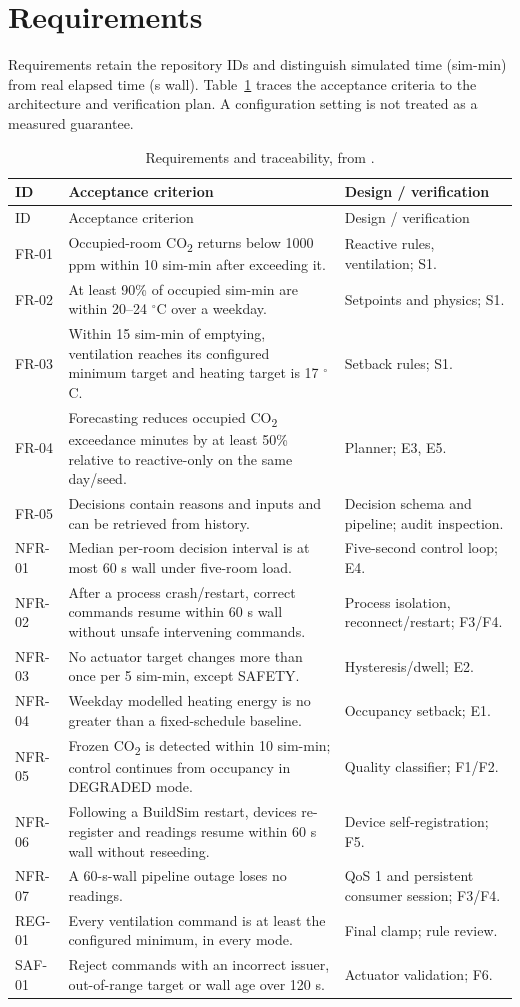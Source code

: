 \documentclass[11pt,a4paper]{article}
\begin{document}
\section{Requirements}
Requirements retain the repository IDs and distinguish simulated time (sim-min) from real elapsed time (s wall). Table~\ref{tab:req} traces the acceptance criteria to the architecture and verification plan. A configuration setting is not treated as a measured guarantee.
{\small\begin{longtable}{p{19mm}p{83mm}p{42mm}}
\caption{Requirements and traceability, from \protect{}.}\label{tab:req}\\
\toprule ID & Acceptance criterion & Design / verification\\\midrule\endfirsthead
\toprule ID & Acceptance criterion & Design / verification\\\midrule\endhead
FR-01 & Occupied-room CO\textsubscript{2} returns below 1000 ppm within 10 sim-min after exceeding it. & Reactive rules, ventilation; S1.\\
FR-02 & At least 90\% of occupied sim-min are within 20--24 $^\circ$C over a weekday. & Setpoints and physics; S1.\\
FR-03 & Within 15 sim-min of emptying, ventilation reaches its configured minimum target and heating target is 17 $^\circ$C. & Setback rules; S1.\\
FR-04 & Forecasting reduces occupied CO\textsubscript{2} exceedance minutes by at least 50\% relative to reactive-only on the same day/seed. & Planner; E3, E5.\\
FR-05 & Decisions contain reasons and inputs and can be retrieved from history. & Decision schema and pipeline; audit inspection.\\
NFR-01 & Median per-room decision interval is at most 60 s wall under five-room load. & Five-second control loop; E4.\\
NFR-02 & After a process crash/restart, correct commands resume within 60 s wall without unsafe intervening commands. & Process isolation, reconnect/restart; F3/F4.\\
NFR-03 & No actuator target changes more than once per 5 sim-min, except SAFETY. & Hysteresis/dwell; E2.\\
NFR-04 & Weekday modelled heating energy is no greater than a fixed-schedule baseline. & Occupancy setback; E1.\\
NFR-05 & Frozen CO\textsubscript{2} is detected within 10 sim-min; control continues from occupancy in DEGRADED mode. & Quality classifier; F1/F2.\\
NFR-06 & Following a BuildSim restart, devices re-register and readings resume within 60 s wall without reseeding. & Device self-registration; F5.\\
NFR-07 & A 60-s-wall pipeline outage loses no readings. & QoS 1 and persistent consumer session; F3/F4.\\
REG-01 & Every ventilation command is at least the configured minimum, in every mode. & Final clamp; rule review.\\
SAF-01 & Reject commands with an incorrect issuer, out-of-range target or wall age over 120 s. & Actuator validation; F6.\\\bottomrule
\end{longtable}}
\end{document}
